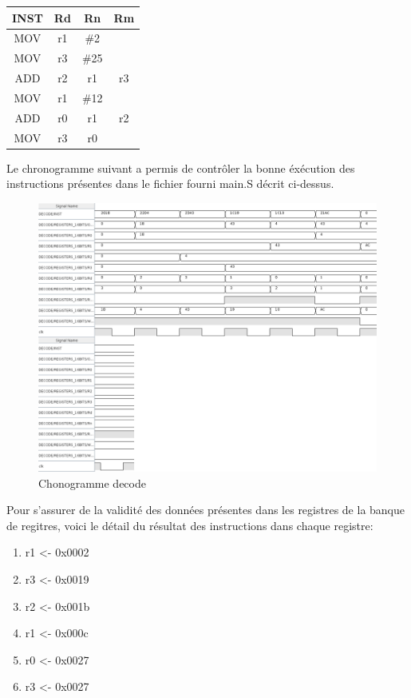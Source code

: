 \documentclass[a4paper]{article} %
\begin{document}
\begin{tabular}{|c|c|c|c|}
    
    \hline
    INST & Rd & Rn  & Rm  \\
    \hline
    MOV  & r1 & \#2  &    \\
    \hline
    MOV  & r3 & \#25 &    \\
    \hline
    ADD  & r2 & r1   & r3 \\
    \hline
    MOV  & r1 & \#12 &    \\
    \hline
    ADD  & r0 & r1   & r2 \\
    \hline
    MOV  & r3 & r0   &    \\
    \hline
\end{tabular}

Le chronogramme suivant a permis de contrôler la bonne éxécution des instructions présentes dans le fichier fourni main.S décrit ci-dessus.

\begin{figure}[H]
    \centering
    \includegraphics[width=1\textwidth]{src/CHRONO_DECODE.png}
    \caption{Chonogramme decode}
    \label{chrono_decode}
\end{figure}
\pagebreak

Pour s'assurer de la validité des données présentes dans les registres de la banque de regitres, voici le détail du résultat des instructions dans chaque registre:
\begin{enumerate}
    \item r1 <- 0x0002
    \item r3 <- 0x0019
    \item r2 <- 0x001b
    \item r1 <- 0x000c
    \item r0 <- 0x0027
    \item r3 <- 0x0027
\end{enumerate}
\end{document}
